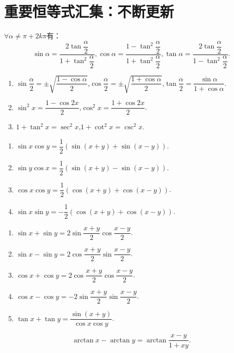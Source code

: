 \section{重要恒等式汇集：不断更新}

\begin{proposition}[三角函数万能公式]
	$\forall \alpha \neq \pi+2k\pi$有：
	\begin{equation}
		\sin{\alpha} = \dfrac{2\tan{\dfrac{\alpha}{2}}}{1+\tan^2\dfrac{\alpha}{2}},\cos{\alpha} = \dfrac{1-\tan^2\dfrac{\alpha}{2}}{1+\tan^2\dfrac{\alpha}{2}},\tan{\alpha} = \dfrac{2\tan{\dfrac{\alpha}{2}}}{1-\tan^2\dfrac{\alpha}{2}}.
	\end{equation}
\end{proposition}


\begin{proposition}[半角公式与倍角公式]
	\begin{enumerate}
		\item $\sin{\dfrac{\alpha}{2}} = \pm\sqrt{\dfrac{1-\cos{\alpha}}{2}}$,$\cos{\dfrac{\alpha}{2}} = \pm\sqrt{\dfrac{1+\cos{\alpha}}{2}}$,$\tan{\dfrac{\alpha}{2}} = \dfrac{\sin{\alpha}}{1+\cos{\alpha}}$.
		\item $\sin^2{x}=\dfrac{1-\cos{2x}}{2}$,$\cos^2{x}=\dfrac{1+\cos{2x}}{2}$.
		\item $1+\tan^2{x} = \sec^2{x}$,$1+\cot^2{x}=\csc^2{x}$.
	\end{enumerate}
\end{proposition}


\begin{theorem}[积化和差]
	\begin{enumerate}
		\item $\sin{x}\cos{y} = \dfrac{1}{2}\left(\sin{(x+y)}+\sin{(x-y)}\right)$.
		\item $\sin{y}\cos{x} = \dfrac{1}{2}\left(\sin{(x+y)}-\sin{(x-y)}\right)$.
		\item $\cos{x}\cos{y} = \dfrac{1}{2}\left(\cos{(x+y)}+\cos{(x-y)}\right)$.
		\item $\sin{x}\sin{y} = -\dfrac{1}{2}\left(\cos{(x+y)}+\cos{(x-y)}\right)$.
	\end{enumerate}
\end{theorem}

\begin{theorem}[和差化积]
	\begin{enumerate}
		\item $\sin{x}+\sin{y} = 2\sin{\dfrac{x+y}{2}}\cos{\dfrac{x-y}{2}}$.
		\item $\sin{x}-\sin{y} = 2\cos{\dfrac{x+y}{2}}\sin{\dfrac{x-y}{2}}$.
		\item $\cos{x}+\cos{y} = 2\cos{\dfrac{x+y}{2}}\cos{\dfrac{x-y}{2}}$.
		\item $\cos{x}-\cos{y} = -2\sin{\dfrac{x+y}{2}}\sin{\dfrac{x-y}{2}}$.
		\item $\tan{x}+\tan{y} = \dfrac{\sin{(x+y)}}{\cos{x}\cos{y}}$.
	\end{enumerate}
\end{theorem}

\begin{proposition}
	\begin{equation}
		\arctan{x} - \arctan{y} = \arctan{\dfrac{x-y}{1+xy}}.
	\end{equation}
\end{proposition}